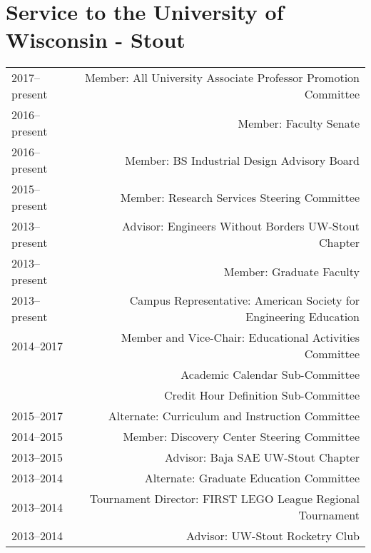 \section*{Service to the University of Wisconsin - Stout}
\begin{tabular}{L!{\VRule}R}
2017--present&Member: All University Associate Professor Promotion Committee\\
2016--present&Member: Faculty Senate\\
2016--present&Member: BS Industrial Design Advisory Board\\
2015--present&Member: Research Services Steering Committee \\
2013--present&Advisor: Engineers Without Borders UW-Stout Chapter \\
2013--present&Member: Graduate Faculty \\
2013--present&Campus Representative: American Society for Engineering Education\\
2014--2017&Member and Vice-Chair: Educational Activities Committee \\
 &Academic Calendar Sub-Committee \\
 &Credit Hour Definition Sub-Committee \\
2015--2017&Alternate: Curriculum and Instruction Committee \\
2014--2015&Member: Discovery Center Steering Committee \\
2013--2015&Advisor: Baja SAE UW-Stout Chapter \\
2013--2014&Alternate: Graduate Education Committee \\
2013--2014&Tournament Director: FIRST LEGO League Regional Tournament\\
2013--2014&Advisor: UW-Stout Rocketry Club\\
\end{tabular}